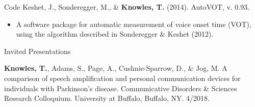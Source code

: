 \documentclass{resume} %
\begin{document}




\begin{rSection}{Code}
	Keshet, J., Sonderegger, M., \& {\bf Knowles, T.} (2014). AutoVOT, v. 0.93.
	\begin{itemize}
			\renewcommand\labelitemi{$\cdot$}
		\item A software package for automatic measurement of voice onset time (VOT), using the algorithm described in Sonderegger \& Keshet (2012).
	\end{itemize}
\end{rSection}


\begin{rSection}{Invited Presentations}

	{\bf Knowles, T.}, Adams, S., Page, A., Cushnie-Sparrow, D., \& Jog, M. A comparison of speech amplification and personal communication devices for individuals with Parkinson's disease. Communicative Disorders \& Sciences Research Colloquium. University at Buffalo, Buffalo, NY. 4/2018.

\end{rSection}

\end{document}
